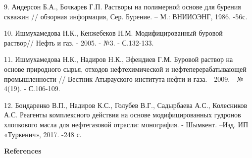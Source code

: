 \begin{noparindent}
9.
  Андерсон Б.А., Бочкарев Г.П. Растворы на полимерной основе для бурения
  скважин // обзорная информация, Сер. Бурение. -- М.: ВНИИОЭНГ, 1986.
  -56с.

10.
  Ишмухамедова Н.К., Кенжебеков Н.М. Модифицированный буровой раствор//
  Нефть и газ. - 2005. - №3. - С.132-133.

11.
  Ишмухамедова Н.К., Надиров Н.К., Эфендиев Г.М. Буровой раствор на
  основе природного сырья, отходов нефтехимической и
  нефтеперерабатывающей промышленности // Вестник Атырауского института
  нефти и газа. - 2009. - № 4(19). - С.106-109.

12.
  Бондаренко В.П., Надиров К.С., Голубев В.Г., Садырбаева А.С.,
  Колесников А.С. Реагенты комплексного действия на основе
  модифицированных гудронов хлопкового масла для нефтегазовой отрасли:
  монография. - Шымкент. --Изд. ИП «Туркенич», 2017. -248 с.
\end{noparindent}

\begin{center}
{\bfseries References}
\end{center}

